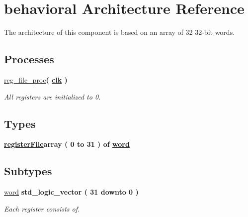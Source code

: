 \hypertarget{classregister__file_1_1behavioral}{\section{behavioral \-Architecture \-Reference}
\label{classregister__file_1_1behavioral}
}


\-The architecture of this component is based on an array of 32 32-\/bit words.  


\*
\*
\subsection*{\-Processes}
 \begin{DoxyCompactItemize}
\item 
\hypertarget{classregister__file_1_1behavioral_a505eecc19921760349f93c27476b8e4c}{\hyperlink{classregister__file_1_1behavioral_a505eecc19921760349f93c27476b8e4c}{reg\-\_\-file\-\_\-proc}{\bfseries  ( {\bfseries {\bfseries \hyperlink{classregister__file_ae5e9fe74cd98136dd9bfe9fe944036a6}{clk}}   } )}}\label{classregister__file_1_1behavioral_a505eecc19921760349f93c27476b8e4c}

\begin{DoxyCompactList}\small\item\em \-All registers are initialized to 0. \end{DoxyCompactList}\end{DoxyCompactItemize}
\subsection*{\-Types}
 \begin{DoxyCompactItemize}
\item 
{\bfseries \hyperlink{classregister__file_1_1behavioral_a312e330e12c981e3094d8419afb16a58}{register\-File}{\bfseries array (  0    to    31  )  of {\bfseries \hyperlink{classregister__file_1_1behavioral_aa89b68ae067d635d4649946a0420ed19}{word}}  }} 
\end{DoxyCompactItemize}
\subsection*{\-Subtypes}
 \begin{DoxyCompactItemize}
\item 
\hypertarget{classregister__file_1_1behavioral_aa89b68ae067d635d4649946a0420ed19}{\hyperlink{classregister__file_1_1behavioral_aa89b68ae067d635d4649946a0420ed19}{word} {\bfseries std\-\_\-logic\-\_\-vector (   31    downto    0  ) } }\label{classregister__file_1_1behavioral_aa89b68ae067d635d4649946a0420ed19}

\begin{DoxyCompactList}\small\item\em \-Each register consists of. \end{DoxyCompactList}\end{DoxyCompactItemize}
